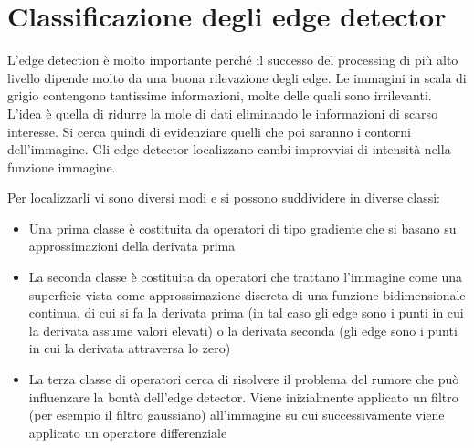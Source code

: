 \section{Classificazione degli edge detector}
L'edge detection è molto importante perché il successo del processing di più alto livello dipende molto da una buona rilevazione degli edge. Le immagini in scala di grigio contengono tantissime informazioni, molte delle quali sono irrilevanti. L'idea è quella di ridurre la mole di dati eliminando le informazioni di scarso interesse. Si cerca quindi di evidenziare quelli che poi saranno i contorni dell'immagine. Gli edge detector localizzano cambi improvvisi di intensità nella funzione
immagine.

Per localizzarli vi sono diversi modi e si possono suddividere in diverse classi:
\begin{itemize}
	\item Una prima classe è costituita da operatori di tipo gradiente che si basano su approssimazioni della derivata prima
	
	\item La seconda classe è costituita da operatori che trattano l'immagine come una superficie vista come approssimazione discreta di una funzione bidimensionale continua, di cui si fa la derivata prima (in tal caso gli edge sono i punti in cui la derivata assume valori elevati) o la	derivata seconda (gli edge sono i punti in cui la derivata attraversa lo zero)
	
	\item La terza classe di operatori cerca di risolvere il problema del rumore che può influenzare la bontà dell'edge detector. Viene inizialmente applicato un filtro (per esempio il filtro gaussiano) all'immagine su cui successivamente viene applicato un operatore differenziale
\end{itemize} 


